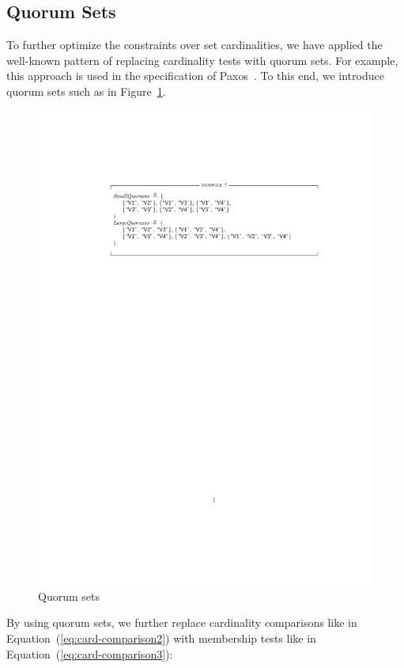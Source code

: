\subsection{Quorum Sets}

To further optimize the constraints over set cardinalities, we have applied the
well-known pattern of replacing cardinality tests with quorum sets. For
example, this approach is used in the specification of Paxos~\cite{tla-paxos}.
To this end, we introduce quorum sets such as in Figure~\ref{fig:quorum-sets}.

\begin{figure}[!h]
    \includegraphics[width=\textwidth]{images/quorum-sets}
    \caption{Quorum sets}\label{fig:quorum-sets}
\end{figure}

By using quorum sets, we further replace cardinality comparisons like in
Equation~(\ref{eq:card-comparison2}) with membership tests like in
Equation~(\ref{eq:card-comparison3}):

